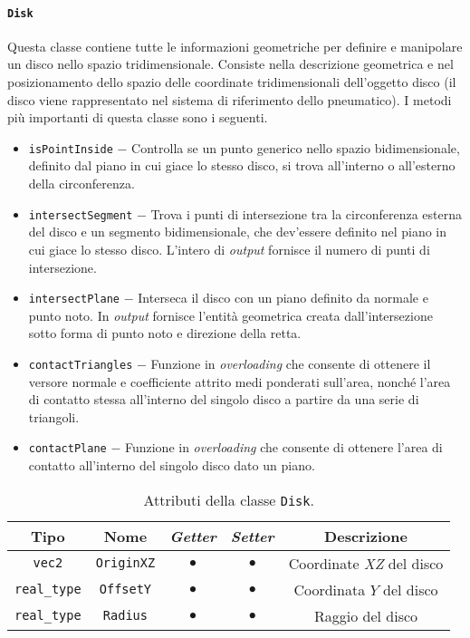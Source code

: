 \paragraph{\texttt{Disk}}
Questa classe contiene tutte le informazioni geometriche per definire e manipolare un disco nello spazio tridimensionale. Consiste nella descrizione geometrica e nel posizionamento dello spazio delle coordinate tridimensionali dell'oggetto disco (il disco viene rappresentato nel sistema di riferimento dello pneumatico). I metodi più importanti di questa classe sono i seguenti.
\begin{itemize}
	\item \texttt{isPointInside} $-$ Controlla se un punto generico nello spazio bidimensionale, definito dal piano in cui giace lo stesso disco, si trova all'interno o all'esterno della circonferenza.
	\item \texttt{intersectSegment} $-$ Trova i punti di intersezione tra la circonferenza esterna del disco e un segmento bidimensionale, che dev'essere definito nel piano in cui giace lo stesso disco. L'intero di \textit{output} fornisce il numero di punti di intersezione.
	\item \texttt{intersectPlane} $-$ Interseca il disco con un piano definito da normale e punto noto. In \textit{output} fornisce l'entità geometrica creata dall'intersezione sotto forma di punto noto e direzione della retta.
	\item \texttt{contactTriangles} $-$ Funzione in \textit{overloading} che consente di ottenere il versore normale e coefficiente attrito medi ponderati sull'area, nonché l'area di contatto stessa all'interno del singolo disco a partire da una serie di triangoli.
	\item \texttt{contactPlane} $-$ Funzione in \textit{overloading} che consente di ottenere l'area di contatto all'interno del singolo disco dato un piano.
\end{itemize}
\begin{table}[h!]
	\centering
	\begin{tabular}{|c|c|c|c|c|}
		\hline 
		\textbf{Tipo} & \textbf{Nome} & \textit{\textbf{Getter}} & \textit{\textbf{Setter}} & \textbf{Descrizione} \\ \hline 
		\texttt{vec2} & \texttt{OriginXZ} & $\bullet$ & $\bullet$ & Coordinate \textit{XZ} del disco \\ \hline 
		\texttt{real\_type} & \texttt{OffsetY} & $\bullet$ & $\bullet$ & Coordinata $Y$ del disco \\ \hline
		\texttt{real\_type} & \texttt{Radius} & $\bullet$ & $\bullet$ & Raggio del disco \\ \hline
	\end{tabular}
	\caption{Attributi della classe \texttt{Disk}.}
	\label{}
\end{table}
%
